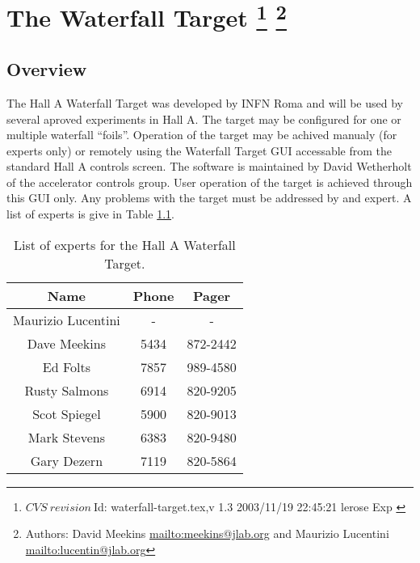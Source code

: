 \chapter[The Waterfall Target]{The Waterfall Target
\footnote{
  $CVS~revision~ $Id: waterfall-target.tex,v 1.3 2003/11/19 22:45:21 lerose Exp $ $
}
\footnote{Authors: David Meekins \url{mailto:meekins@jlab.org} and 
 Maurizio Lucentini \url{mailto:lucentin@jlab.org}}
}

\section{Overview}

The Hall A Waterfall Target was developed by INFN Roma and will be
used by several aproved experiments in Hall A. The target may be configured
for one or multiple waterfall {}``foils''. Operation of the target
may be achived manualy (for experts only) or remotely using the Waterfall
Target GUI accessable from the standard Hall A controls screen. The
software is maintained by David Wetherholt of the accelerator controls
group. User operation of the target is achieved through this GUI only.
Any problems with the target must be addressed by and expert. A list
of experts is give in Table \ref{tab: experts}.%
\begin{table}
\begin{center}\begin{tabular}{|c|c|c|}
\hline 
Name &
Phone&
Pager\\
\hline
\hline 
Maurizio Lucentini&
-&
-\\
\hline
Dave Meekins&
5434&
872-2442\\
\hline
Ed Folts&
7857&
989-4580\\
\hline
Rusty Salmons&
6914&
820-9205\\
\hline
Scot Spiegel&
5900&
820-9013\\
\hline
Mark Stevens&
6383&
820-9480\\
\hline
Gary Dezern&
7119&
820-5864\\
\hline
\end{tabular}\end{center}


\caption{List of experts for the Hall A Waterfall Target.\label{tab: experts}}
\end{table}


